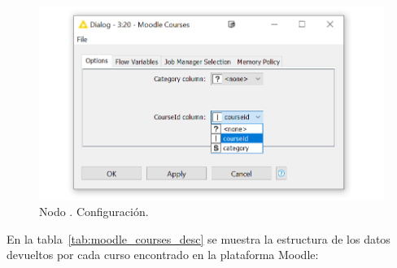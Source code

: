 \begin{figure}[!h]
	\centering
	\includegraphics[width=1\textwidth]{img/nodes_moodle_courses_settings.png}
	\caption{Nodo . Configuración.}
	\label{fig:moodlecourses_settings}
\end{figure}
\FloatBarrier

En la tabla~\ref{tab:moodle_courses_desc} se muestra la estructura de los datos devueltos por cada curso encontrado en la plataforma Moodle: 

